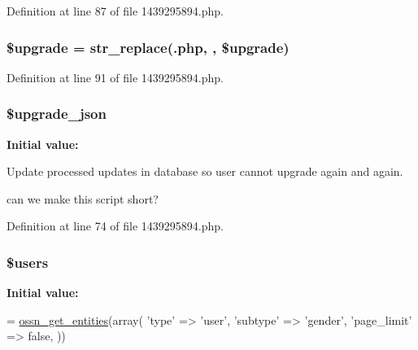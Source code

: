 Definition at line 87 of file 1439295894.\+php.

\subsubsection[{\texorpdfstring{\$upgrade}{$upgrade}}]{\setlength{\rightskip}{0pt plus 5cm}\$upgrade = str\+\_\+replace(\textquotesingle{}.php\textquotesingle{}, \textquotesingle{}\textquotesingle{}, \$upgrade)}\hypertarget{1439295894_8php_a9084097ce600d3cc7a79a20ecaea9906}{}\label{1439295894_8php_a9084097ce600d3cc7a79a20ecaea9906}


Definition at line 91 of file 1439295894.\+php.

\subsubsection[{\texorpdfstring{\$upgrade\+\_\+json}{$upgrade_json}}]{\setlength{\rightskip}{0pt plus 5cm}\$upgrade\+\_\+json}\hypertarget{1439295894_8php_a512525d0f5eb608ac72ca7b85e5fbf65}{}\label{1439295894_8php_a512525d0f5eb608ac72ca7b85e5fbf65}
{\bfseries Initial value\+:}
Update processed updates in database so user cannot upgrade again and again.

can we make this script short? 

Definition at line 74 of file 1439295894.\+php.

\subsubsection[{\texorpdfstring{\$users}{$users}}]{\setlength{\rightskip}{0pt plus 5cm}\$users}\hypertarget{1439295894_8php_a28005d22fa7ef2dfe215ad886b497d9c}{}\label{1439295894_8php_a28005d22fa7ef2dfe215ad886b497d9c}
{\bfseries Initial value\+:}
\begin{DoxyCode}
= \hyperlink{ossn_8lib_8entities_8php_a9f5ff2f2853395ef7cb7fd1824324395}{ossn\_get\_entities}(array(
        \textcolor{stringliteral}{'type'} => \textcolor{stringliteral}{'user'},
        \textcolor{stringliteral}{'subtype'} => \textcolor{stringliteral}{'gender'},
        \textcolor{stringliteral}{'page\_limit'} => \textcolor{keyword}{false},
))
\end{DoxyCode}



